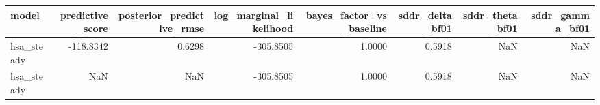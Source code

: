 \begin{tabular}{lrrrrrrr}
\toprule
model & predictive\_score & posterior\_predictive\_rmse & log\_marginal\_likelihood & bayes\_factor\_vs\_baseline & sddr\_delta\_bf01 & sddr\_theta\_bf01 & sddr\_gamma\_bf01 \\
\midrule
hsa\_steady & -118.8342 & 0.6298 & -305.8505 & 1.0000 & 0.5918 & NaN & NaN \\
hsa\_steady & NaN & NaN & -305.8505 & 1.0000 & 0.5918 & NaN & NaN \\
\bottomrule
\end{tabular}
